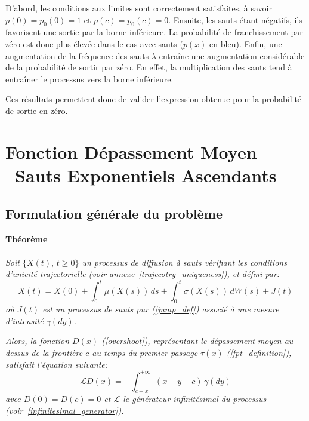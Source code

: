 D'abord, les conditions aux limites sont correctement satisfaites, à savoir \( p(0) = p_0(0) = 1 \) et \( p(c) = p_0(c) = 0 \). Ensuite, les sauts étant négatifs, ils favorisent une sortie par la borne inférieure. La probabilité de franchissement par zéro est donc plus élevée dans le cas avec sauts ($p(x)$ en bleu). Enfin, une augmentation de la fréquence des sauts $\lambda$ entraîne une augmentation considérable de la probabilité de sortir par zéro. En effet, la multiplication des sauts tend à entraîner le processus vers la borne inférieure.

Ces résultats permettent donc de valider l'expression obtenue pour la probabilité de sortie en zéro.

\section{Fonction Dépassement Moyen \textemdash~Sauts Exponentiels Ascendants}
\subsection{Formulation générale du problème}
\paragraph{Théorème} 
\textit{Soit \(\{X(t),\,t \geq 0\}\) un processus de diffusion à sauts vérifiant les conditions d'unicité trajectorielle (voir annexe~\ref{trajecotry_uniqueness}), et défini par:}
\[
X(t) = X(0) + \int_0^t \mu(X(s))\,ds + \int_0^t \sigma(X(s))\,dW(s) + J(t)
\]
\textit{où \(J(t)\) est un processus de sauts pur (\ref{jump_def}) associé à une mesure d'intensité \(\gamma(dy)\).}  

\textit{Alors, la fonction \(D(x)\) (\ref{overshoot}), représentant le dépassement moyen au-dessus de la frontière \(c\) au temps du premier passage \(\tau(x)\) (\ref{fpt_definition}), satisfait l'équation suivante:}
\begin{equation}\label{general_overshoot_ide}
    \mathcal{L}D(x) = -\int_{c - x}^{+\infty} (x + y - c)\,\gamma(dy)
\end{equation}
\textit{avec \(D(0) = D(c) = 0\) et \(\mathcal{L}\) le générateur infinitésimal du processus (voir~\ref{infinitesimal_generator}).}

